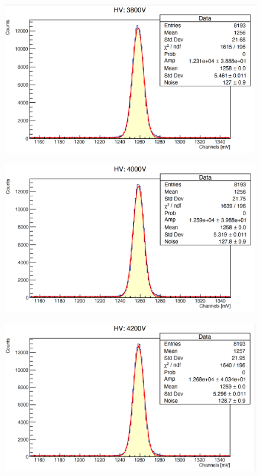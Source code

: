 \documentclass[a4paper,10pt]{article}
\begin{document}
\begin{figure}[H]
    \centering
    \includegraphics[scale=0.45]{appendice/3800}
\end{figure}
\begin{figure}[H]
    \centering
    \includegraphics[scale=0.45]{appendice/4000}
\end{figure}
\begin{figure}[H]
    \centering
    \includegraphics[scale=0.45]{appendice/4200}
\end{figure}
\end{document}
